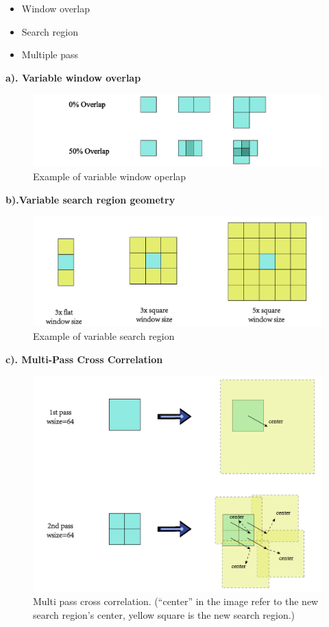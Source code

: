 \begin{itemize}
	\item Window overlap
	\item Search region
	\item Multiple pass
\end{itemize}

\textbf{a). Variable window overlap}
\begin{figure}[h!]
	\centering
	\includegraphics[width=1\linewidth]{figures/part2/window_overlap}
	\caption{Example of variable window operlap}
	\label{fig:window_overlap}
\end{figure}

\textbf{b).Variable search region geometry}
\begin{figure}[h!]
	\centering
	\includegraphics[width=1\linewidth]{figures/part2/search_region}
	\caption{Example of variable search region}
	\label{fig:search_region}
\end{figure}

\textbf{c). Multi-Pass Cross Correlation}
\begin{figure}[h!]
	\centering
	\includegraphics[width=1\linewidth]{figures/part2/multi_pass}
	\caption{Multi pass cross correlation. (``center'' in the image refer to the new search region's center, yellow square is the new search region.)}
	\label{fig:multi_pass}
\end{figure}


